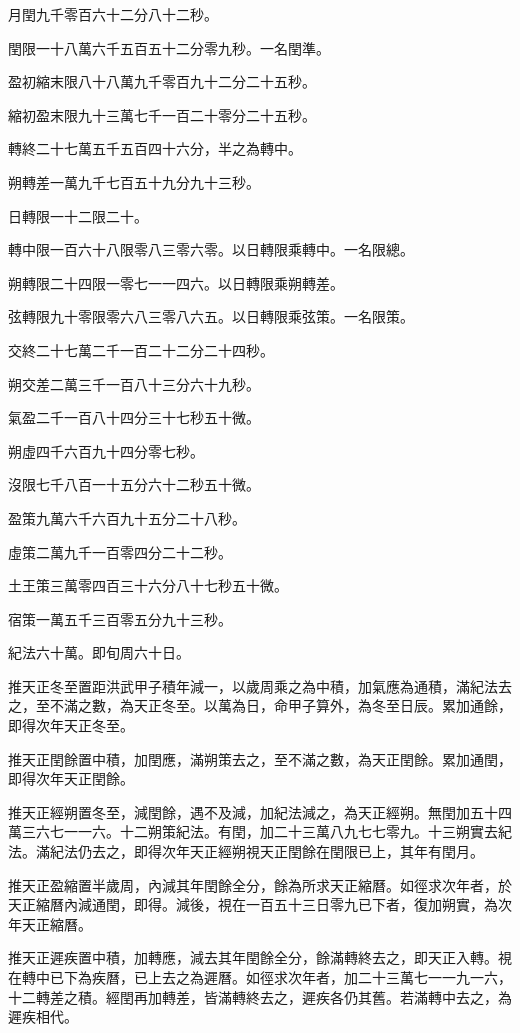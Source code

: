 月閏九千零百六十二分八十二秒。

閏限一十八萬六千五百五十二分零九秒。一名閏準。

盈初縮末限八十八萬九千零百九十二分二十五秒。

縮初盈末限九十三萬七千一百二十零分二十五秒。

轉終二十七萬五千五百四十六分，半之為轉中。

朔轉差一萬九千七百五十九分九十三秒。

日轉限一十二限二十。

轉中限一百六十八限零八三零六零。以日轉限乘轉中。一名限總。

朔轉限二十四限一零七一一四六。以日轉限乘朔轉差。

弦轉限九十零限零六八三零八六五。以日轉限乘弦策。一名限策。

交終二十七萬二千一百二十二分二十四秒。

朔交差二萬三千一百八十三分六十九秒。

氣盈二千一百八十四分三十七秒五十微。

朔虛四千六百九十四分零七秒。

沒限七千八百一十五分六十二秒五十微。

盈策九萬六千六百九十五分二十八秒。

虛策二萬九千一百零四分二十二秒。

土王策三萬零四百三十六分八十七秒五十微。

宿策一萬五千三百零五分九十三秒。

紀法六十萬。即旬周六十日。

推天正冬至置距洪武甲子積年減一，以歲周乘之為中積，加氣應為通積，滿紀法去之，至不滿之數，為天正冬至。以萬為日，命甲子算外，為冬至日辰。累加通餘，即得次年天正冬至。

推天正閏餘置中積，加閏應，滿朔策去之，至不滿之數，為天正閏餘。累加通閏，即得次年天正閏餘。

推天正經朔置冬至，減閏餘，遇不及減，加紀法減之，為天正經朔。無閏加五十四萬三六七一一六。十二朔策紀法。有閏，加二十三萬八九七七零九。十三朔實去紀法。滿紀法仍去之，即得次年天正經朔視天正閏餘在閏限已上，其年有閏月。

推天正盈縮置半歲周，內減其年閏餘全分，餘為所求天正縮曆。如徑求次年者，於天正縮曆內減通閏，即得。減後，視在一百五十三日零九已下者，復加朔實，為次年天正縮曆。

推天正遲疾置中積，加轉應，減去其年閏餘全分，餘滿轉終去之，即天正入轉。視在轉中已下為疾曆，已上去之為遲曆。如徑求次年者，加二十三萬七一一九一六，十二轉差之積。經閏再加轉差，皆滿轉終去之，遲疾各仍其舊。若滿轉中去之，為遲疾相代。

